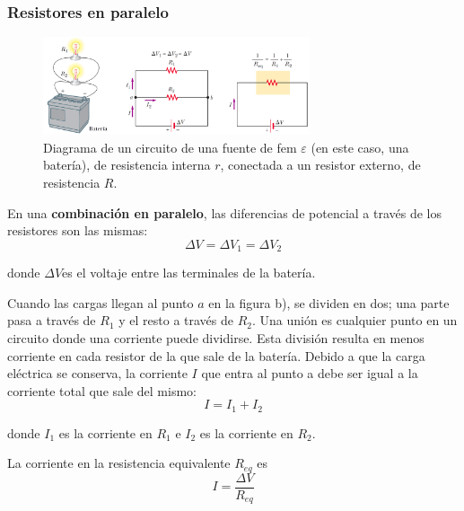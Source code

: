     \subsubsection{Resistores en paralelo}

      \begin{figure}[H]
      \centering
        \includegraphics[width=0.7\textwidth]{4/figure_12}
        \caption{Diagrama de un circuito de una fuente de fem $\varepsilon$ (en este caso, una batería), de resistencia
        interna $r$, conectada a un resistor externo, de resistencia $R$.}
      \end{figure}

      \PN En una \textbf{combinación en paralelo}, las diferencias de potencial a través de los resistores son las
      mismas:
      \begin{equation*}
        \Delta V = \Delta V_{1} = \Delta V_{2}
      \end{equation*}

      \PN donde $\Delta V$es el voltaje entre las terminales de la batería.

      \VS
      \PN Cuando las cargas llegan al punto $a$ en la figura b), se dividen en dos; una parte pasa a través de $R_{1}$ y
      el resto a través de $R_{2}$. Una unión es cualquier punto en un circuito donde una corriente puede dividirse.
      Esta división resulta en menos corriente en cada resistor de la que sale de la batería. Debido a que la carga
      eléctrica se conserva, la corriente $I$ que entra al punto a debe ser igual a la corriente total que sale del
      mismo:
      \begin{equation*}
        I = I_{1} + I_{2}
      \end{equation*}

      \PN donde $I_{1}$ es la corriente en $R_{1}$ e $I_{2}$ es la corriente en $R_{2}$.

      \VS
      \PN La corriente en la resistencia equivalente $R_{eq}$ es
      \begin{equation*}
        I = \frac{\Delta V}{R_{eq}}
      \end{equation*}

